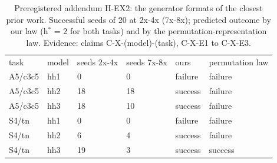 \documentclass[10pt,twocolumn,a4paper]{article}
\begin{document}
\begin{table}[t]\centering\small\caption{Preregistered addendum H-EX2: the generator formats of the closest prior work. Successful seeds of 20 at 2x-4x (7x-8x); predicted outcome by our law (h$^*$ = 2 for both tasks) and by the permutation-representation law. Evidence: claims C-X-(model)-(task), C-X-E1 to C-X-E3.}
\begin{tabular}{llllll}\hline
task & model & seeds 2x-4x & seeds 7x-8x & ours & permutation law \\
A5/c3c5 & hh1 & 0 & 0 & failure & failure \\
A5/c3c5 & hh2 & 18 & 18 & success & failure \\
A5/c3c5 & hh3 & 18 & 10 & success & failure \\
S4/tn & hh1 & 0 & 0 & failure & failure \\
S4/tn & hh2 & 6 & 4 & success & failure \\
S4/tn & hh3 & 19 & 3 & success & success \\\hline
\end{tabular}\end{table}
\onecolumn
\appendix
\end{document}
